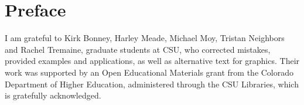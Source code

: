 \chapter{Preface}


I am grateful to Kirk Bonney, Harley Meade, Michael Moy, Tristan Neighbors
and  Rachel Tremaine, graduate students at CSU, who corrected mistakes,
provided examples and applications, as well as alternative text for graphics.
Their work was supported by an Open Educational Materials grant from the
Colorado Department of Higher Education, administered through the CSU
Libraries, which is gratefully acknowledged.
